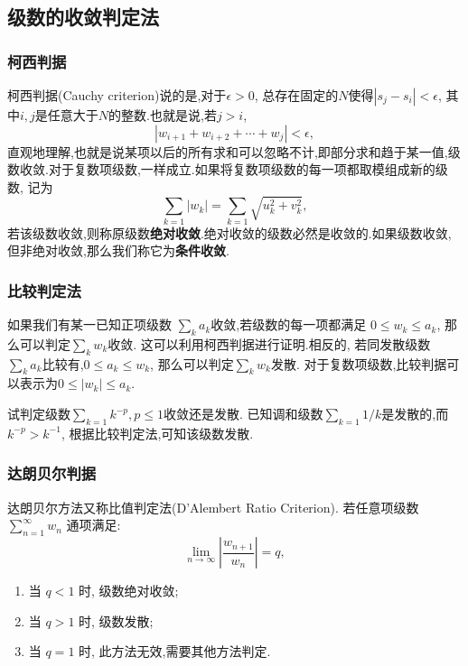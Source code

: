 \subsection{级数的收敛判定法}

\subsubsection{柯西判据}
柯西判据(Cauchy criterion)说的是,对于$\epsilon>0$, 总存在固定的$N$使得$|s_j - s_i|< \epsilon$, 其中$i,j$是任意大于$N$的整数.也就是说,若$j>i$,
\begin{equation}
    | w_{i+1} + w_{i+2} + \cdots + w_{j} | < \epsilon ,
\end{equation}
直观地理解,也就是说某项以后的所有求和可以忽略不计,即部分求和趋于某一值,级数收敛.对于复数项级数,一样成立.如果将复数项级数的每一项都取模组成新的级数,
记为
\begin{equation}
    \sum_{k=1} |w_k| = \sum_{k=1}\sqrt { u_k^2 + v_k^2},
\end{equation}
若该级数收敛,则称原级数\textbf{绝对收敛}.绝对收敛的级数必然是收敛的.如果级数收敛,但非绝对收敛,那么我们称它为\textbf{条件收敛}.
\subsubsection{比较判定法}
如果我们有某一已知正项级数 $\sum_k a_k$收敛,若级数的每一项都满足 $0 \leq w_k \leq a_k$, 那么可以判定$\sum_k w_k$收敛.
这可以利用柯西判据进行证明.相反的, 若同发散级数$\sum_{k} a_k$比较有,$0 \leq a_k  \leq w_k$, 那么可以判定$\sum_k w_k$发散.
对于复数项级数,比较判据可以表示为$0 \leq |w_k| \leq a_k$.

\begin{examplebox}{试判定级数$\sum_{k=1} k^{-p}, p\leq 1$收敛还是发散.}
    已知调和级数$\sum_{k=1}1/k$是发散的,而 $k^{-p} > k^{-1}$, 根据比较判定法,可知该级数发散.
\end{examplebox}

\subsubsection{达朗贝尔判据}
达朗贝尔方法又称比值判定法(D'Alembert Ratio Criterion).
若任意项级数 $\sum_{n=1}^{\infty} w_n$ 通项满足:
$$
\lim _{n \to \infty}\left|\frac{w_{n+1}}{w_n}\right|=q ,
$$
\begin{enumerate}
    \item 当 $q<1$ 时, 级数绝对收敛;
    \item 当 $q>1$ 时, 级数发散;
    \item 当 $q=1$ 时, 此方法无效,需要其他方法判定.
\end{enumerate}

